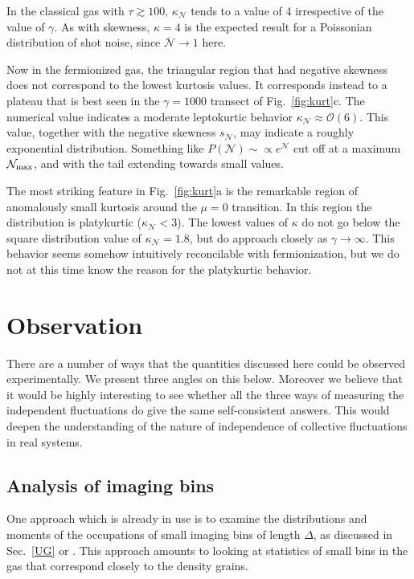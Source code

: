 \documentclass[aps,twocolumn,pra,superscriptaddress,nofootinbib,amsmath,amssymb,floats,floatfix,english]{revtex4-1}
\newcommand{\mc}[1]{{\mathcal{#1}}}
\newcommand{\wb}[1]{{\overline{#1}}}
\begin{document}
In the classical gas with $\tau\gtrsim100$, $\kappa_{\mc{N}}$ tends to a value of 4 irrespective of the value  of $\gamma$. 
As with skewness, $\kappa=4$ is the expected result for a Poissonian distribution of shot noise, since $\wb{\mc{N}}\to1$ here.

Now in the fermionized gas, the triangular region that had  negative skewness does not correspond to the lowest kurtosis values. It corresponds instead to a plateau that is best seen in the $\gamma=1000$ transect of Fig.~\ref{fig:kurt}c. 
The numerical value indicates a moderate leptokurtic behavior $\kappa_{\mc{N}}\approx\mc{O}(6)$. This value, together with the negative skewness $s_{\mc{N}}$, may indicate a roughly exponential distribution. Something like  
$P(\mc{N})\sim\propto e^{\mc{N}}$ cut off at a maximum $\mc{N}_{\rm max}$, and with the tail extending towards small values. 

The most striking feature in Fig.~\ref{fig:kurt}a is the remarkable region of anomalously small kurtosis around the $\mu=0$ transition.
In this region the distribution is platykurtic ($\kappa_{\mc{N}}<3$). The lowest values of $\kappa$ do not go below the square distribution value of $\kappa_{\mc{N}}=1.8$,
but do approach closely as $\gamma\to\infty$. This behavior seems somehow intuitively reconcilable with fermionization, but we do not at this time know the reason for the platykurtic behavior.



\section{Observation}
\label{OBS}

There are a number of ways that the quantities discussed here could be observed experimentally. We present three angles on this below. Moreover we believe that it would be highly interesting to see whether all the three ways of measuring the independent fluctuations do give the same self-consistent answers. This would deepen the understanding of the nature of independence of collective fluctuations in real systems.  


\subsection{Analysis of imaging bins}
\label{OBS_BIN}
One approach which is already in use is to examine the distributions and moments of the occupations of small imaging bins  
of length $\Delta$, as discussed in Sec.~\ref{UG} or \cite{Bisset13}. 
This approach amounts to looking at statistics of small bins in the gas that correspond closely to the density grains.
\end{document}
